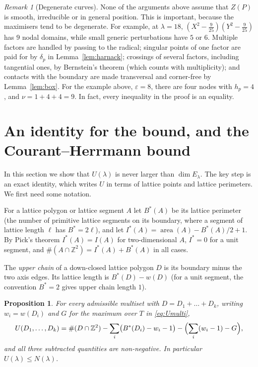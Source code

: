 \documentclass[11pt]{amsart}
\newtheorem{proposition}[theorem]{Proposition}
\theoremstyle{definition}
\theoremstyle{remark}
\newtheorem{remark}[theorem]{Remark}
\newcommand{\Z}{\mathbb{Z}}
\numberwithin{equation}{section}
\begin{document}
\begin{remark}[Degenerate curves]\label{rem:degenerate}
None of the arguments above assume that $Z(P)$ is smooth, irreducible or in general position.
This is important, because the maximisers tend to be degenerate. For example, at $\lambda=18$, $(X^2-\tfrac{9}{25})(Y^2-\tfrac{9}{25})$ has
$9$ nodal domains, while small generic perturbations have $5$ or $6$. Multiple factors are
handled by passing to the radical; singular points of one factor are paid for by $\delta_p$
in Lemma~\ref{lem:harnack}; crossings of several factors, including tangential ones, by
Bernstein's theorem (which counts with multiplicity); and contacts with the boundary are made
transversal and corner-free by Lemma~\ref{lem:box}. For the example above, $\varepsilon=8$,
there are four nodes with $h_p=4$, and $\nu=1+4+4=9$. In fact, every inequality in the proof is an
equality.
\end{remark}

\section{An identity for the bound, and the Courant--Herrmann bound}\label{sec:identity}

In this section we show that $U(\lambda)$ is never larger than $\dim E_\lambda$. The key step is
an exact identity, which writes $U$ in terms of lattice points and lattice perimeters. We first
need some notation.

For a lattice polygon or lattice segment $A$ let $B^*(A)$ be its lattice perimeter (the
number of primitive lattice segments on its boundary, where a segment of lattice length $\ell$ has
$B^*=2\ell$), and let $I^*(A)=\operatorname{area}(A)-B^*(A)/2+1$. By Pick's theorem
$I^*(A)=I(A)$ for two-dimensional $A$, $I^*=0$ for a unit segment, and
$\#(A\cap\Z^2)=I^*(A)+B^*(A)$ in all cases.

The \emph{upper chain} of a down-closed lattice polygon $D$ is its boundary minus the two
axis edges. Its lattice length is $B^*(D)-w(D)$ (for a unit segment, the convention
$B^*=2$ gives upper chain length $1$).

\begin{proposition}\label{prop:identity}
For every admissible multiset with $D=D_1+\dots+D_k$, writing $w_i=w(D_i)$ and $G$ for the
maximum over $T$ in \eqref{eq:Umulti},
\begin{equation}\label{eq:identity}
U(D_1,\dots,D_k)=\#(D\cap\Z^2)-\sum_i\bigl(B^*(D_i)-w_i-1\bigr)-\Bigl(\sum_i(w_i-1)-G\Bigr),
\end{equation}
and all three subtracted quantities are non-negative. In particular $U(\lambda)\le N(\lambda)$.
\end{proposition}
\end{document}
